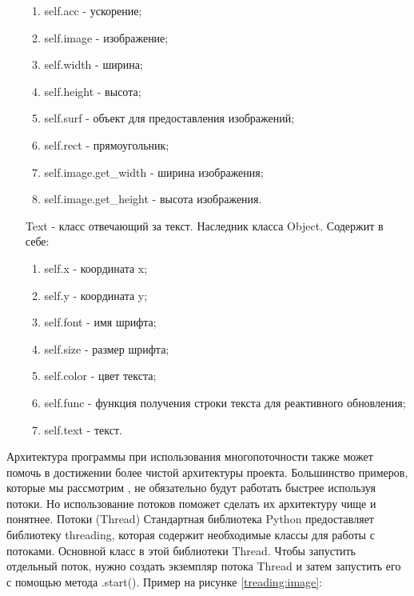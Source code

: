 \begin{itemize}
\begin{enumerate}
				\item self.acc - ускорение;
				\item self.image - изображение;
				\item self.width - ширина;
				\item self.height - высота;
				\item self.surf - объект для предоставления изображений;
				\item self.rect - прямоугольник;
				\item self.image.get\_width - ширина изображения;
				\item self.image.get\_height - высота изображения.
		\end{enumerate}
		\item[Text] - класс отвечающий за текст. Наследник класса Object. Содержит в себе:
		\begin{enumerate}
				\item self.x - координата x;
				\item self.y - координата y;
				\item self.font - имя шрифта;
				\item self.size - размер шрифта;
				\item self.color - цвет текста;
				\item self.func - функция получения строки текста для реактивного обновления;
				\item self.text - текст.
		\end{enumerate}
\end{itemize}		
Архитектура программы при использования многопоточности также может помочь в достижении более чистой архитектуры проекта. Большинство примеров, которые мы рассмотрим , не обязательно будут работать быстрее используя потоки. Но использование потоков поможет сделать их архитектуру чище и понятнее.
Потоки (Thread)
Стандартная библиотека Python предоставляет библиотеку threading, которая содержит необходимые классы для работы с потоками. Основной класс в этой библиотеки Thread. Чтобы запустить отдельный поток, нужно создать экземпляр потока Thread и затем запустить его с помощью метода .start(). Пример на рисунке \ref{treading:image}:

